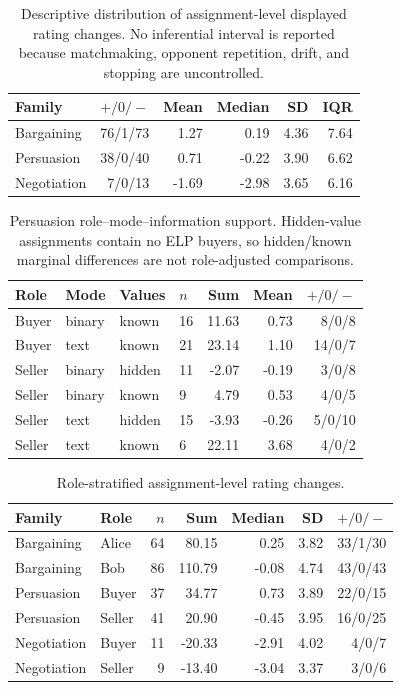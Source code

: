 \begin{table}[t]
\caption{Descriptive distribution of assignment-level displayed rating changes. No inferential interval is reported because matchmaking, opponent repetition, drift, and stopping are uncontrolled.}
\label{tab:v33-distribution}
\centering\scriptsize
\begin{tabular}{lrrrrr}
\toprule
Family & $+ / 0 / -$ & Mean & Median & SD & IQR \\
\midrule
Bargaining & 76/1/73 & 1.27 & 0.19 & 4.36 & 7.64 \\
Persuasion & 38/0/40 & 0.71 & -0.22 & 3.90 & 6.62 \\
Negotiation & 7/0/13 & -1.69 & -2.98 & 3.65 & 6.16 \\
\bottomrule
\end{tabular}
\end{table}

\begin{table}[t]
\caption{Persuasion role--mode--information support. Hidden-value assignments contain no ELP buyers, so hidden/known marginal differences are not role-adjusted comparisons.}
\label{tab:v33-persuasion-support}
\centering\scriptsize
\begin{tabular}{llllrrr}
\toprule
Role & Mode & Values & $n$ & Sum & Mean & $+ / 0 / -$ \\
\midrule
Buyer & binary & known & 16 & 11.63 & 0.73 & 8/0/8 \\
Buyer & text & known & 21 & 23.14 & 1.10 & 14/0/7 \\
Seller & binary & hidden & 11 & -2.07 & -0.19 & 3/0/8 \\
Seller & binary & known & 9 & 4.79 & 0.53 & 4/0/5 \\
Seller & text & hidden & 15 & -3.93 & -0.26 & 5/0/10 \\
Seller & text & known & 6 & 22.11 & 3.68 & 4/0/2 \\
\bottomrule
\end{tabular}
\end{table}

\begin{table}[t]
\caption{Role-stratified assignment-level rating changes.}
\label{tab:v33-role-distribution}
\centering\scriptsize
\begin{tabular}{llrrrrr}
\toprule
Family & Role & $n$ & Sum & Median & SD & $+ / 0 / -$ \\
\midrule
Bargaining & Alice & 64 & 80.15 & 0.25 & 3.82 & 33/1/30 \\
Bargaining & Bob & 86 & 110.79 & -0.08 & 4.74 & 43/0/43 \\
Persuasion & Buyer & 37 & 34.77 & 0.73 & 3.89 & 22/0/15 \\
Persuasion & Seller & 41 & 20.90 & -0.45 & 3.95 & 16/0/25 \\
Negotiation & Buyer & 11 & -20.33 & -2.91 & 4.02 & 4/0/7 \\
Negotiation & Seller & 9 & -13.40 & -3.04 & 3.37 & 3/0/6 \\
\bottomrule
\end{tabular}
\end{table}

